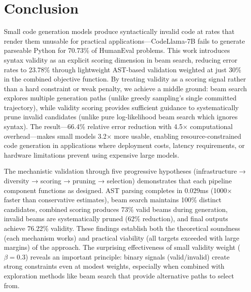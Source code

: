 \section{Conclusion}

Small code generation models produce syntactically invalid code at rates that render them unusable for practical applications---CodeLlama-7B fails to generate parseable Python for 70.73\% of HumanEval problems. This work introduces syntax validity as an explicit scoring dimension in beam search, reducing error rates to 23.78\% through lightweight AST-based validation weighted at just 30\% in the combined objective function. By treating validity as a scoring signal rather than a hard constraint or weak penalty, we achieve a middle ground: beam search explores multiple generation paths (unlike greedy sampling's single committed trajectory), while validity scoring provides sufficient guidance to systematically prune invalid candidates (unlike pure log-likelihood beam search which ignores syntax). The result---66.4\% relative error reduction with 4.5$\times$ computational overhead---makes small models 3.2$\times$ more usable, enabling resource-constrained code generation in applications where deployment costs, latency requirements, or hardware limitations prevent using expensive large models.

The mechanistic validation through five progressive hypotheses (infrastructure → diversity → scoring → pruning → selection) demonstrates that each pipeline component functions as designed. AST parsing completes in 0.029ms (1000$\times$ faster than conservative estimates), beam search maintains 100\% distinct candidates, combined scoring produces 73\% valid beams during generation, invalid beams are systematically pruned (62\% reduction), and final outputs achieve 76.22\% validity. These findings establish both the theoretical soundness (each mechanism works) and practical viability (all targets exceeded with large margins) of the approach. The surprising effectiveness of small validity weight ($\beta=0.3$) reveals an important principle: binary signals (valid/invalid) create strong constraints even at modest weights, especially when combined with exploration methods like beam search that provide alternative paths to select from.


